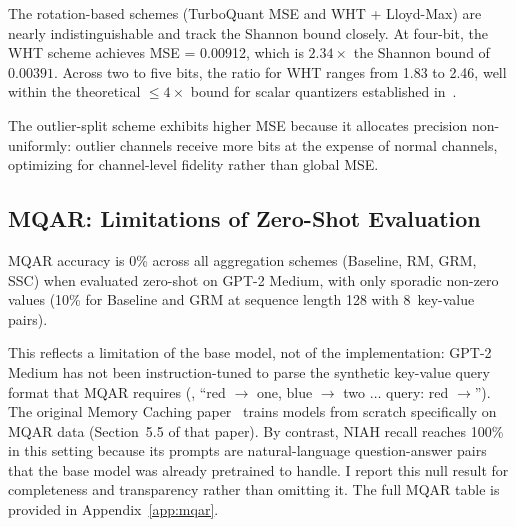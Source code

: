 The rotation-based schemes (TurboQuant MSE and WHT + Lloyd-Max) are
nearly indistinguishable and track the Shannon bound closely.
At four-bit, the WHT scheme achieves MSE = 0.00912, which is
$2.34{\times}$ the Shannon bound of $0.00391$.
Across two to five bits, the ratio for WHT ranges from 1.83 to 2.46,
well within the theoretical $\leq 4{\times}$ bound for scalar quantizers
established in~\cite{zandieh2025turboquant}.

The outlier-split scheme exhibits higher MSE because it allocates
precision non-uniformly: outlier channels receive more bits at the
expense of normal channels, optimizing for channel-level fidelity rather
than global MSE.

\subsection{MQAR: Limitations of Zero-Shot Evaluation}
\label{sec:results:mqar}

MQAR accuracy is 0\% across all aggregation schemes (Baseline, RM, GRM,
SSC) when evaluated zero-shot on GPT-2 Medium, with only sporadic
non-zero values (10\% for Baseline and GRM at sequence length 128 with
8~key-value pairs).

This reflects a limitation of the base model, not of the implementation:
GPT-2 Medium has not been instruction-tuned to parse the synthetic
key-value query format that MQAR requires (\eg,
``red $\rightarrow$ one, blue $\rightarrow$ two $\ldots$ query:
red $\rightarrow$'').
The original Memory Caching paper~\cite{behrouz2026mc} trains models
from scratch specifically on MQAR data (Section~5.5 of that paper).
By contrast, NIAH recall reaches 100\% in this setting because its
prompts are natural-language question-answer pairs that the base model
was already pretrained to handle.
I report this null result for completeness and transparency rather than
omitting it.
The full MQAR table is provided in Appendix~\ref{app:mqar}.
